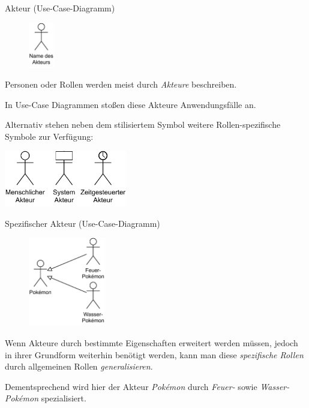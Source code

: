\begin{diag}{Akteur (Use-Case-Diagramm)}
    \begin{figure}
        \centering
        \includegraphics[width=0.1\textwidth]{includes/figures/defi_diagrams_use_case_akteur.pdf}
    \end{figure}
    Personen oder Rollen werden meist durch \emph{Akteure} beschreiben.

    In Use-Case Diagrammen stoßen diese Akteure Anwendungsfälle an.

    Alternativ stehen neben dem stilisiertem Symbol weitere Rollen-spezifische Symbole zur Verfügung:

    \begin{center}
        \includegraphics[width=0.4\textwidth]{includes/figures/defi_diagrams_use_case_akteur_types.pdf}
    \end{center}
\end{diag}

\begin{bonus}{Spezifischer Akteur (Use-Case-Diagramm)}
    \begin{figure}
        \centering
        \includegraphics[width=0.3\textwidth]{includes/figures/bonus_diagrams_use_case_akteur_specification.pdf}
    \end{figure}
    Wenn Akteure durch bestimmte Eigenschaften erweitert werden müssen, jedoch in ihrer Grundform weiterhin benötigt werden, kann man diese \emph{spezifische Rollen} durch allgemeinen Rollen \emph{generalisieren}.

    Dementsprechend wird hier der Akteur \emph{Pokémon} durch \emph{Feuer-} sowie \emph{Wasser-Pokémon} spezialisiert.

    \vspace{7em}
\end{bonus}

